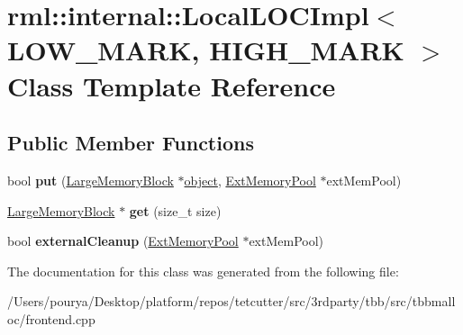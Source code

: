 \hypertarget{classrml_1_1internal_1_1LocalLOCImpl}{}\section{rml\+:\+:internal\+:\+:Local\+L\+O\+C\+Impl$<$ L\+O\+W\+\_\+\+M\+A\+R\+K, H\+I\+G\+H\+\_\+\+M\+A\+R\+K $>$ Class Template Reference}
\label{classrml_1_1internal_1_1LocalLOCImpl}
\subsection*{Public Member Functions}
\begin{DoxyCompactItemize}
\item 
\hypertarget{classrml_1_1internal_1_1LocalLOCImpl_a40f0e9cea1a99d95d786f52e2dc8add9}{}bool {\bfseries put} (\hyperlink{structrml_1_1internal_1_1LargeMemoryBlock}{Large\+Memory\+Block} $\ast$\hyperlink{structobject}{object}, \hyperlink{structrml_1_1internal_1_1ExtMemoryPool}{Ext\+Memory\+Pool} $\ast$ext\+Mem\+Pool)\label{classrml_1_1internal_1_1LocalLOCImpl_a40f0e9cea1a99d95d786f52e2dc8add9}

\item 
\hypertarget{classrml_1_1internal_1_1LocalLOCImpl_af40a0514dcc47ac4ceccfea084adb199}{}\hyperlink{structrml_1_1internal_1_1LargeMemoryBlock}{Large\+Memory\+Block} $\ast$ {\bfseries get} (size\+\_\+t size)\label{classrml_1_1internal_1_1LocalLOCImpl_af40a0514dcc47ac4ceccfea084adb199}

\item 
\hypertarget{classrml_1_1internal_1_1LocalLOCImpl_a80e3527b3fb859a937366335f05832f5}{}bool {\bfseries external\+Cleanup} (\hyperlink{structrml_1_1internal_1_1ExtMemoryPool}{Ext\+Memory\+Pool} $\ast$ext\+Mem\+Pool)\label{classrml_1_1internal_1_1LocalLOCImpl_a80e3527b3fb859a937366335f05832f5}

\end{DoxyCompactItemize}


The documentation for this class was generated from the following file\+:\begin{DoxyCompactItemize}
\item 
/\+Users/pourya/\+Desktop/platform/repos/tetcutter/src/3rdparty/tbb/src/tbbmalloc/frontend.\+cpp\end{DoxyCompactItemize}
